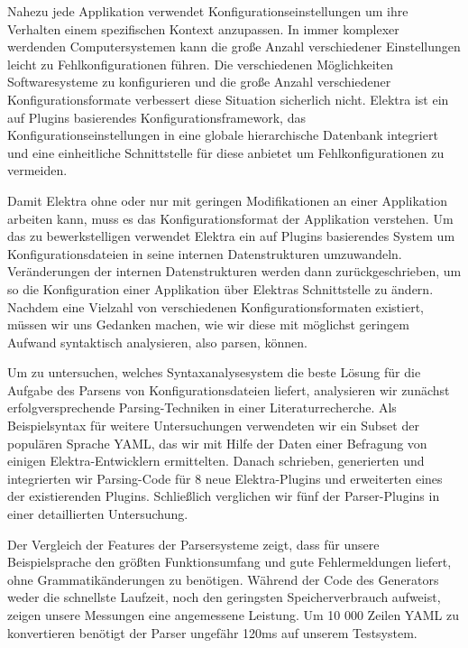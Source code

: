 \begin{kurzfassung}
\begin{sloppypar}
Nahezu jede Applikation verwendet Konfigurationseinstellungen um ihre Verhalten einem spezifischen Kontext anzupassen. In immer komplexer werdenden Computersystemen kann die große Anzahl verschiedener Einstellungen leicht zu Fehlkonfigurationen führen. Die verschiedenen Möglichkeiten Softwaresysteme zu konfigurieren und die große Anzahl verschiedener Konfigurationsformate verbessert diese Situation sicherlich nicht. Elektra ist ein auf Plugins basierendes Konfigurationsframework, das Konfigurationseinstellungen in eine globale hierarchische Datenbank integriert und eine einheitliche Schnittstelle für diese anbietet um Fehlkonfigurationen zu vermeiden.
\end{sloppypar}

Damit Elektra ohne oder nur mit geringen Modifikationen an einer Applikation arbeiten kann, muss es das Konfigurationsformat der Applikation verstehen. Um das zu bewerkstelligen verwendet Elektra ein auf Plugins basierendes System um Konfigurationsdateien in seine internen Datenstrukturen umzuwandeln. Veränderungen der internen Datenstrukturen werden dann zurückgeschrieben, um so die Konfiguration einer Applikation über Elektras Schnittstelle zu ändern. Nachdem eine Vielzahl von verschiedenen Konfigurationsformaten existiert, müssen wir uns Gedanken machen, wie wir diese mit möglichst geringem Aufwand syntaktisch analysieren, also parsen, können.

\begin{sloppypar}
Um zu untersuchen, welches Syntaxanalysesystem die beste Lösung für die Aufgabe des Parsens von Konfigurationsdateien liefert, analysieren wir zunächst  erfolgversprechende Parsing-Techniken in einer Literaturrecherche. Als Beispielsyntax für weitere Untersuchungen verwendeten wir ein Subset der populären Sprache YAML, das wir mit Hilfe der Daten einer Befragung von einigen Elektra-Entwicklern ermittelten. Danach schrieben, generierten und integrierten wir Parsing-Code für 8 neue Elektra-Plugins und erweiterten eines der existierenden Plugins. Schließlich verglichen wir fünf der Parser-Plugins in einer detaillierten Untersuchung.
\end{sloppypar}

Der Vergleich der Features der Parsersysteme zeigt, dass für unsere Beispielsprache  den größten Funktionsumfang und gute Fehlermeldungen liefert, ohne Grammatikänderungen zu benötigen. Während der Code des Generators weder die schnellste Laufzeit, noch den geringsten Speicherverbrauch aufweist, zeigen unsere Messungen eine angemessene Leistung. Um 10 000 Zeilen YAML zu konvertieren benötigt der Parser ungefähr 120ms auf unserem Testsystem.
\end{kurzfassung}

